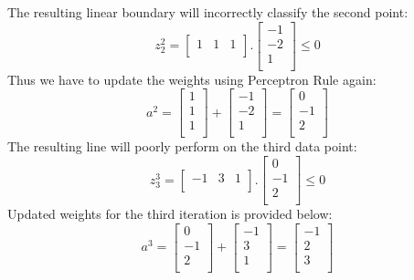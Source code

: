 \documentclass[12pt]{article}
\numberwithin{equation}{section}
\numberwithin{table}{section}
\numberwithin{figure}{section}
\begin{document}
The resulting linear boundary will incorrectly classify the second point:
$$
	z_2^2 = \begin{bmatrix}
	1 & 1 & 1\\
	\end{bmatrix}.\begin{bmatrix}
	-1 \\
	-2 \\
	1 \\
	\end{bmatrix} \leq 0
$$
Thus we have to update the weights using Perceptron Rule again:
$$
	a^2 = \begin{bmatrix}
	1 \\
	1 \\
	1 \\
	\end{bmatrix} + \begin{bmatrix}
	-1 \\
	-2 \\
	1 \\
	\end{bmatrix} = \begin{bmatrix}
	0 \\
	-1 \\
	2 \\
	\end{bmatrix}
$$
The resulting line will poorly perform on the third data point:
$$
z_3^3 = \begin{bmatrix}
-1 & 3 & 1\\
\end{bmatrix}.\begin{bmatrix}
0 \\
-1 \\
2 \\
\end{bmatrix} \leq 0
$$
Updated weights for the third iteration is provided below:
$$
	a^3 = \begin{bmatrix}
	0 \\
	-1 \\
	2 \\
	\end{bmatrix} + \begin{bmatrix}
	-1 \\
	3 \\
	1 \\
	\end{bmatrix} = \begin{bmatrix}
	-1 \\
	2 \\
	3 \\
	\end{bmatrix}
$$
\end{document}

